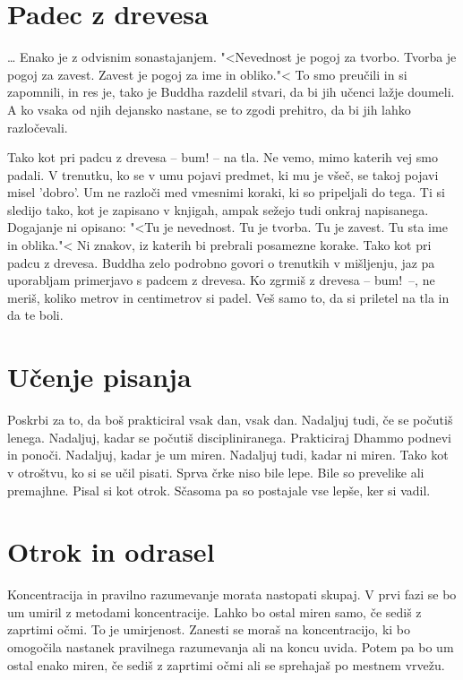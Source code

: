 \section{Padec z drevesa}

\ldots{} Enako je z odvisnim sonastajanjem. "<Nevednost je pogoj za tvorbo. Tvorba je pogoj za zavest. Zavest je pogoj za ime in obliko."< To smo preučili in si zapomnili, in res je, tako je Buddha razdelil stvari, da bi jih učenci lažje doumeli. A ko vsaka od njih dejansko nastane, se to zgodi prehitro, da bi jih lahko razločevali.

Tako kot pri padcu z drevesa – bum! – na tla. Ne vemo, mimo katerih vej smo padali. V trenutku, ko se v umu pojavi predmet, ki mu je všeč, se takoj pojavi misel 'dobro'. Um ne razloči med vmesnimi koraki, ki so pripeljali do tega. Ti si sledijo tako, kot je zapisano v knjigah, ampak sežejo tudi onkraj napisanega. Dogajanje ni opisano: "<Tu je nevednost. Tu je tvorba. Tu je zavest. Tu sta ime in oblika."< Ni znakov, iz katerih bi prebrali posamezne korake. Tako kot pri padcu z drevesa. Buddha zelo podrobno govori o trenutkih v mišljenju, jaz pa uporabljam primerjavo s padcem z drevesa. Ko zgrmiš z drevesa – bum! –, ne meriš, koliko metrov in centimetrov si padel. Veš samo to, da si priletel na tla in da te boli.

\section{Učenje pisanja}

Poskrbi za to, da boš prakticiral vsak dan, vsak dan. Nadaljuj tudi, če se počutiš lenega. Nadaljuj, kadar se počutiš discipliniranega. Prakticiraj Dhammo podnevi in ponoči. Nadaljuj, kadar je um miren. Nadaljuj tudi, kadar ni miren. Tako kot v otroštvu, ko si se učil pisati. Sprva črke niso bile lepe. Bile so prevelike ali premajhne. Pisal si kot otrok. Sčasoma pa so postajale vse lepše, ker si vadil.

\section{Otrok in odrasel}

Koncentracija in pravilno razumevanje morata nastopati skupaj. V prvi fazi se bo um umiril z metodami koncentracije. Lahko bo ostal miren samo, če sediš z zaprtimi očmi. To je umirjenost. Zanesti se moraš na koncentracijo, ki bo omogočila nastanek pravilnega razumevanja ali na koncu uvida. Potem pa bo um ostal enako miren, če sediš z zaprtimi očmi ali se sprehajaš po mestnem vrvežu.

